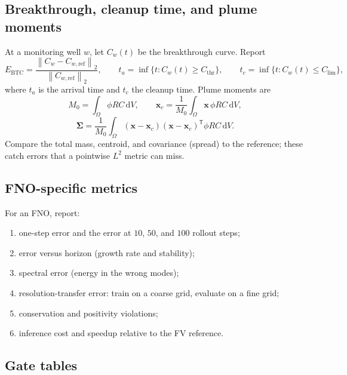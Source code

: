 \documentclass[11pt]{article}
\newcommand{\xx}{\mathbf{x}}
\newcommand{\norm}[1]{\left\lVert #1 \right\rVert}
\newcommand{\intO}{\int_{\Omega}}
\newcommand{\dd}{\,\mathrm{d}}
\newcommand{\T}{\mathsf{T}}
\begin{document}
\subsection{Breakthrough, cleanup time, and plume moments}

At a monitoring well $w$, let $C_w(t)$ be the breakthrough curve.  Report
\begin{equation}
\label{eq:btc}
E_{\mathrm{BTC}}=\frac{\norm{C_w-C_{w,\mathrm{ref}}}_2}
{\norm{C_{w,\mathrm{ref}}}_2},
\qquad
t_a=\inf\{t:C_w(t)\ge C_{\mathrm{thr}}\},
\qquad
t_c=\inf\{t:C_w(t)\le C_{\mathrm{lim}}\},
\end{equation}
where $t_a$ is the arrival time and $t_c$ the cleanup time.  Plume moments are
\begin{equation}
\label{eq:moments}
M_0=\intO\phi R C\dd V,\qquad
\xx_c=\frac1{M_0}\intO\xx\,\phi R C\dd V,
\end{equation}
\begin{equation}
\label{eq:cov}
\boldsymbol{\Sigma}=\frac1{M_0}\intO
(\xx-\xx_c)(\xx-\xx_c)^{\T}\phi R C\dd V .
\end{equation}
Compare the total mass, centroid, and covariance (spread) to the reference;
these catch errors that a pointwise $L^2$ metric can miss.

\subsection{FNO-specific metrics}

For an FNO, report:
\begin{enumerate}[leftmargin=1.6em,itemsep=2pt]
  \item one-step error and the error at $10$, $50$, and $100$ rollout steps;
  \item error versus horizon (growth rate and stability);
  \item spectral error (energy in the wrong modes);
  \item resolution-transfer error: train on a coarse grid, evaluate on a fine
        grid;
  \item conservation and positivity violations;
  \item inference cost and speedup relative to the FV reference.
\end{enumerate}

\subsection{Gate tables}
\end{document}
